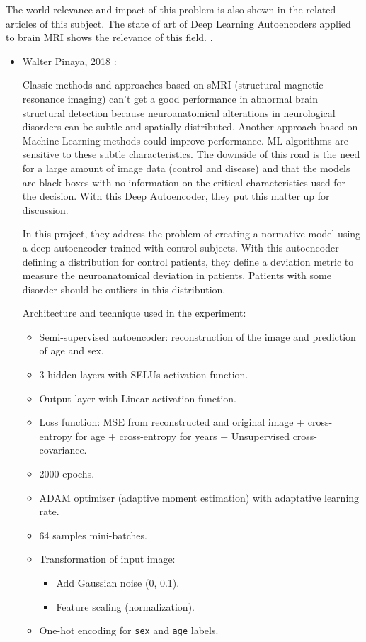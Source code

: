 The world relevance and impact of this problem is also shown in the related articles of this subject. The state of art of Deep Learning Autoencoders applied to brain MRI shows the relevance of this field. .

\begin{itemize}
    \item Walter Pinaya, 2018 \cite{pinaya2019}:
    
    Classic methods and approaches based on sMRI (structural magnetic resonance imaging) can't get a good performance in abnormal brain structural detection because neuroanatomical alterations in neurological disorders can be subtle and spatially distributed. Another approach based on Machine Learning methods could improve performance. ML algorithms are sensitive to these subtle characteristics. The downside of this road is the need for a large amount of image data (control and disease) and that the models are black-boxes with no information on the critical characteristics used for the decision. With this Deep Autoencoder, they put this matter up for discussion.
    
    In this project, they address the problem of creating a normative model using a deep autoencoder trained with control subjects. With this autoencoder defining a distribution for control patients, they define a deviation metric to measure the neuroanatomical deviation in patients. Patients with some disorder should be outliers in this distribution.
    
    Architecture and technique used in the experiment:
    \begin{itemize}
        \item Semi-supervised autoencoder: reconstruction of the image and prediction of age and sex.
        \item 3 hidden layers with SELUs activation function.
        \item Output layer with Linear activation function.
        \item Loss function: MSE from reconstructed and original image + cross-entropy for age + cross-entropy for years + Unsupervised cross-covariance.
        \item 2000 epochs.
        \item ADAM optimizer (adaptive moment estimation) with adaptative learning rate.
        \item 64 samples mini-batches.
        \item Transformation of input image:
        \begin{itemize}
            \item Add Gaussian noise (0, 0.1).
            \item Feature scaling (normalization).
        \end{itemize}
        \item One-hot encoding for \texttt{sex} and \texttt{age} labels.
    \end{itemize}
    

\end{itemize}
